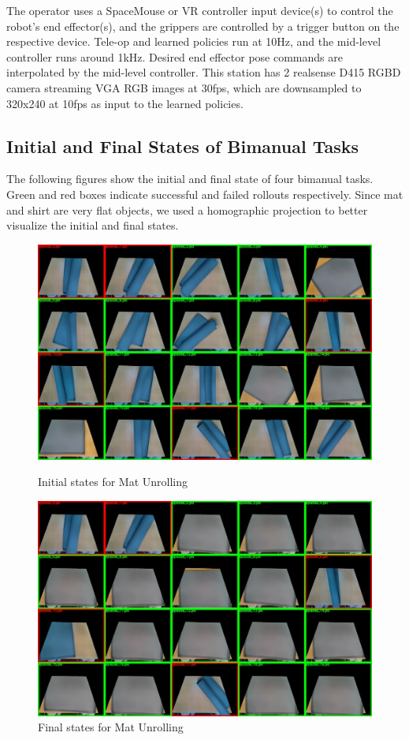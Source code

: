 The operator uses a SpaceMouse or VR controller input device(s) to control the robot's end effector(s), and the grippers are controlled by a trigger button on the respective device. Tele-op and learned policies run at 10Hz, and the mid-level controller runs around 1kHz. Desired end effector pose commands are interpolated by the mid-level controller. This station has 2 realsense D415 RGBD camera streaming VGA RGB images at 30fps, which are downsampled to 320x240 at 10fps as input to the learned policies.

\subsection{Initial and Final States of Bimanual Tasks} 
\label{sec:bimanual_ini_fial}
The following figures show the initial and final state of four bimanual tasks. Green and red boxes indicate successful and failed rollouts respectively. Since mat and shirt are very flat objects, we used a homographic projection to better visualize the initial and final states.

\begin{figure}
    \centering
    \includegraphics[width=\linewidth]{figure/ijrr24_unroll_mat_ini.jpg}
    \caption{Initial states for Mat Unrolling}
    \label{fig:unroll_mat_ini}
    \centering
    \includegraphics[width=\linewidth]{figure/ijrr24_unroll_mat_last.jpg}
    \caption{Final states for Mat Unrolling}
    \label{fig:unroll_mat_last}
\end{figure}


